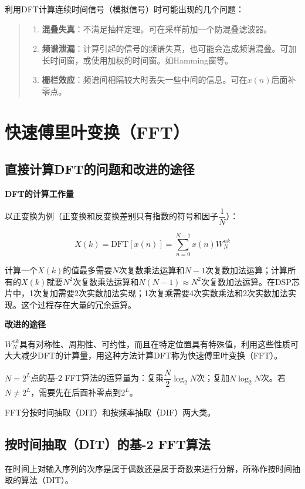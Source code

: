\documentclass[cn, hazy, blue, normal, 14pt]{elegantnote}
\begin{document}
利用DFT计算连续时间信号（模拟信号）时可能出现的几个问题：

\begin{quote}
\begin{enumerate}
    \item \textbf{混叠失真}：不满足抽样定理。可在采样前加一个防混叠滤波器。
    \item \textbf{频谱泄漏}：计算引起的信号的频谱失真，也可能会造成频谱混叠。可加长时间窗，或使用加权的时间窗。如Hamming窗等。
    \item \textbf{栅栏效应}：频谱间相隔较大时丢失一些中间的信息。可在$x(n)$后面补零点。
\end{enumerate}
\end{quote}

\section{快速傅里叶变换（FFT）}

\subsection{直接计算DFT的问题和改进的途径}

\textbf{DFT的计算工作量}

以正变换为例（正变换和反变换差别只有指数的符号和因子$\dfrac{1}{N}$）：

$$X(k)=\text{DFT}[{x}(n)]=\sum_{n=0}^{N-1}{{x}(n)W_{N}^{nk}}$$

计算一个$X(k)$的值最多需要$N$次复数乘法运算和$N-1$次复数加法运算；计算所有的$X(k)$就要$N^2$次复数乘法运算和$N(N-1)\approx N^2$次复数加法运算。在DSP芯片中，1次复加需要2次实数加法实现；1次复乘需要4次实数乘法和2次实数加法实现。这个过程存在大量的冗余运算。

\textbf{改进的途径}

$W_N^{nk}$具有对称性、周期性、可约性，而且在特定位置具有特殊值，利用这些性质可大大减少DFT的计算量，用这种方法计算DFT称为快速傅里叶变换（FFT）。

$N=2^L$点的基-2 FFT算法的运算量为：复乘$\dfrac{N}{2}\log_2 N$次；复加$N\log_2 N$次。若$N\neq2^L$，需要先在后面补零点到$2^L$。

FFT分按时间抽取（DIT）和按频率抽取（DIF）两大类。


\subsection{按时间抽取（DIT）的基-2 FFT算法}

在时间上对输入序列的次序是属于偶数还是属于奇数来进行分解，所称作按时间抽取的算法（DIT）。
\end{document}
